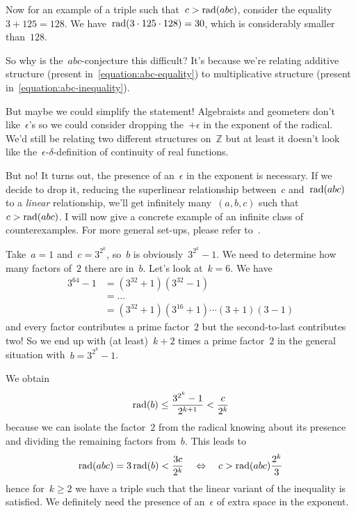 \begin{example}
  \label{example:abc-2}
  Now for an example of a triple such that~$c>\operatorname{rad}(abc)$, consider the equality~$3+125=128$. We have~$\operatorname{rad}(3\cdot 125\cdot 128)=30$, which is considerably smaller than~$128$.
\end{example}

So why is the~$abc$\nobreakdash-conjecture this difficult? It's because we're relating additive structure (present in~\eqref{equation:abc-equality}) to multiplicative structure (present in~\eqref{equation:abc-inequality}).

But maybe we could simplify the statement! Algebraists and geometers don't like~$\epsilon$'s so we could consider dropping the~$+\epsilon$ in the exponent of the radical. We'd still be relating two different structures on~$\mathbb{Z}$ but at least it doesn't look like the~$\epsilon$-$\delta$-definition of continuity of real functions.

\begin{remark}
  But no! It turns out, the presence of an~$\epsilon$ in the exponent is necessary. If we decide to drop it, reducing the superlinear relationship between~$c$ and~$\operatorname{rad}(abc)$ to a \emph{linear} relationship, we'll get infinitely many~$(a,b,c)$ such that~$c>\operatorname{rad}(abc)$. I will now give a concrete example of an infinite class of counterexamples. For more general set-ups, please refer to~\cite{lower-bounds-abc-hits}.
  
  Take~$a=1$ and~$c=3^{2^k}$, so~$b$ is obviously~$3^{2^k}-1$. We need to determine how many factors of~$2$ there are in~$b$. Let's look at~$k=6$. We have
  \begin{equation}
    \begin{aligned}
      3^{64}-1&=(3^{32}+1)(3^{32}-1) \\
      &=\ldots \\
      &=(3^{32}+1)(3^{16}+1)\cdots(3+1)(3-1)
    \end{aligned}
  \end{equation}
  and every factor contributes a prime factor~$2$ but the second-to-last contributes two! So we end up with (at least)~$k+2$ times a prime factor~$2$ in the general situation with~$b=3^{2^k}-1$.
  
  We obtain
  \begin{equation}
    \operatorname{rad}(b)\leq\frac{3^{2^k}-1}{2^{k+1}}<\frac{c}{2^{k}}
  \end{equation}
  because we can isolate the factor~$2$ from the radical knowing about its presence and dividing the remaining factors from~$b$. This leads to
  \begin{equation}
    \operatorname{rad}(abc)=3\operatorname{rad}(b)<\frac{3c}{2^k}\quad\Leftrightarrow\quad c>\operatorname{rad}(abc)\frac{2^k}{3}
  \end{equation}
  hence for~$k\geq 2$ we have a triple such that the linear variant of the inequality is satisfied. We definitely need the presence of an~$\epsilon$ of extra space in the exponent.
\end{remark}

